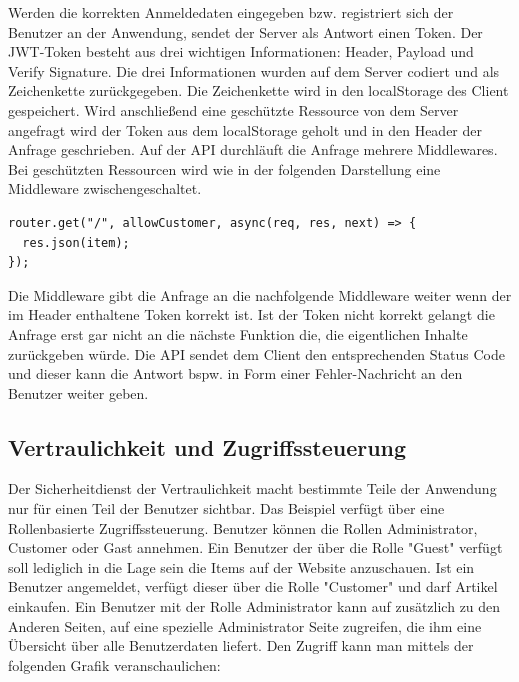 \documentclass[utf8,biblatex]{lni}
\begin{document}
Werden die korrekten Anmeldedaten eingegeben bzw. registriert sich der Benutzer an der 
Anwendung, sendet der Server als Antwort einen Token. 
Der JWT-Token besteht aus drei wichtigen Informationen: Header, Payload und Verify Signature.
Die drei Informationen wurden auf dem Server codiert und als Zeichenkette zurückgegeben. 
Die Zeichenkette wird in den localStorage des Client gespeichert. Wird anschließend eine 
geschützte Ressource von dem Server angefragt wird der Token aus dem localStorage geholt 
und in den Header der Anfrage geschrieben.
Auf der API durchläuft die Anfrage mehrere Middlewares. 
Bei geschützten Ressourcen wird wie in der folgenden Darstellung eine Middleware 
zwischengeschaltet. 

\begin{verbatim}
router.get("/", allowCustomer, async(req, res, next) => {
  res.json(item);
});
\end{verbatim}

Die Middleware gibt die Anfrage an die nachfolgende Middleware weiter wenn der im Header enthaltene 
Token korrekt ist. Ist der Token nicht korrekt gelangt die Anfrage erst gar nicht an die nächste Funktion die,
die eigentlichen Inhalte zurückgeben würde. 
Die API sendet dem Client den entsprechenden Status Code und dieser kann die Antwort bspw. in Form 
einer Fehler-Nachricht an den Benutzer weiter geben. 

\subsection{Vertraulichkeit und Zugriffssteuerung}

Der Sicherheitdienst der Vertraulichkeit macht bestimmte Teile der Anwendung nur für einen Teil der Benutzer sichtbar. 
Das Beispiel verfügt über eine Rollenbasierte Zugriffssteuerung. 
Benutzer können die Rollen Administrator, Customer oder Gast annehmen.
Ein Benutzer der über die Rolle "Guest" verfügt soll lediglich in die Lage sein die Items auf der Website anzuschauen. 
Ist ein Benutzer angemeldet, verfügt dieser über die Rolle "Customer" und darf Artikel einkaufen. 
Ein Benutzer mit der Rolle Administrator kann auf zusätzlich zu den Anderen Seiten, auf eine spezielle Administrator Seite zugreifen, die ihm eine Übersicht über 
alle Benutzerdaten liefert. 
Den Zugriff kann man mittels der folgenden Grafik veranschaulichen:
\end{document}
